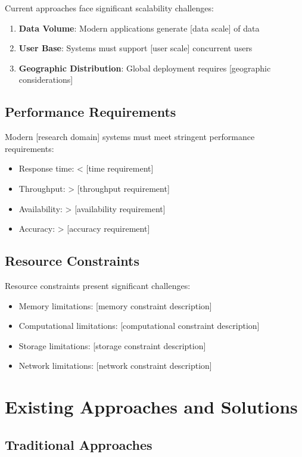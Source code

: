 Current approaches face significant scalability challenges:
\begin{enumerate}
    \item \textbf{Data Volume}: Modern applications generate [data scale] of data
    \item \textbf{User Base}: Systems must support [user scale] concurrent users
    \item \textbf{Geographic Distribution}: Global deployment requires [geographic considerations]
\end{enumerate}

\subsection{Performance Requirements}

Modern [research domain] systems must meet stringent performance requirements:
\begin{itemize}
    \item Response time: < [time requirement]
    \item Throughput: > [throughput requirement]
    \item Availability: > [availability requirement]
    \item Accuracy: > [accuracy requirement]
\end{itemize}

\subsection{Resource Constraints}

Resource constraints present significant challenges:
\begin{itemize}
    \item Memory limitations: [memory constraint description]
    \item Computational limitations: [computational constraint description]
    \item Storage limitations: [storage constraint description]
    \item Network limitations: [network constraint description]
\end{itemize}

\section{Existing Approaches and Solutions}

\subsection{Traditional Approaches}

